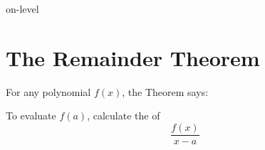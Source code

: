 \begin{taggedblock}{on-level}

\section{The Remainder Theorem}

For any polynomial $f(x)$,
the  Theorem says:
%
\begin{myCenteredBox}[width=4.75in]
    To evaluate $f(a)$, calculate the  of 
    \large
    \begin{equation*}
        \frac{f(x)}{x-a}
    \end{equation*}
\end{myCenteredBox}

\end{taggedblock}